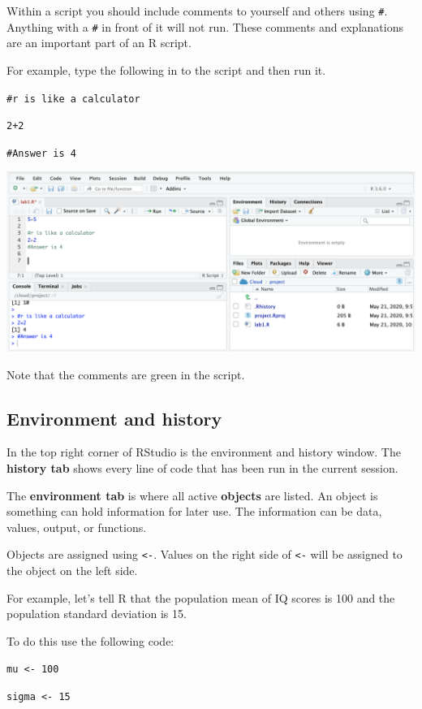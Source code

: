 \documentclass[
]{book}
\begin{document}
Within a script you should include comments to yourself and others using \texttt{\#}. Anything with a \texttt{\#} in front of it will not run. These comments and explanations are an important part of an R script.

For example, type the following in to the script and then run it.

\texttt{\#r\ is\ like\ a\ calculator}

\texttt{2+2}

\texttt{\#Answer\ is\ 4}

\includegraphics{img/comment.png}

Note that the comments are green in the script.

\hypertarget{environment-and-history}{%
\subsection{Environment and history}\label{environment-and-history}}

In the top right corner of RStudio is the environment and history window. The \textbf{history tab} shows every line of code that has been run in the current session.

The \textbf{environment tab} is where all active \textbf{objects} are listed. An object is something can hold information for later use. The information can be data, values, output, or functions.

Objects are assigned using \texttt{\textless{}-}. Values on the right side of \texttt{\textless{}-} will be assigned to the object on the left side.

For example, let's tell R that the population mean of IQ scores is 100 and the population standard deviation is 15.

To do this use the following code:

\texttt{mu\ \textless{}-\ 100}

\texttt{sigma\ \textless{}-\ 15}
\end{document}
